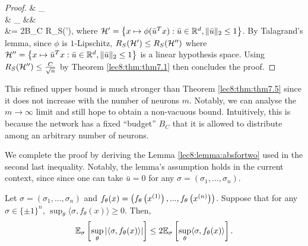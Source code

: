\begin{proof}
{&\le {} \E_{\sigma} \\
&\le {}  \E_{\sigma} &&  \\
&= 2B_C R_S(\cH '),
}
where $\mathcal H' = \left\{x \mapsto \phi(\bar{u}^T x) :  \bar{u} \in \mathbb{R}^d, \|\bar{u}\|_2 \leq 1 \right\}$. By Talagrand's lemma, since $\phi$ is $1$-Lipschitz, $R_S(\mathcal H') \leq R_S(\mathcal H'')$ where  $\mathcal H'' = \left\{x \mapsto \bar{u}^T x :  \bar{u} \in \mathbb{R}^d, \|\bar{u}\|_2 \leq 1 \right\}$ is a linear hypothesis space. Using $R_S(\mathcal H'') \leq \frac{C}{\sqrt{n}}$ by Theorem \ref{lec8:thm:thm7.1} then concludes the proof.

\end{proof}

\begin{remark}
This refined upper bound is much stronger than Theorem \ref{lec8:thm:thm7.5} since it does not increase with the number of neurons $m$. Notably, we can analyse the $m \to \infty$ limit and still hope to obtain a non-vacuous bound. Intuitively, this is because the network has a fixed ``budget'' $B_C$ that it is allowed to distribute among an arbitrary number of neurons.
\end{remark}


We complete the proof by deriving the Lemma \ref{lec8:lemma:absfortwo} used in the second last inequality. Notably, the lemma's assumption holds in the current context, since
since one can take $\bar{u} = 0$ for any $\sigma = (\sigma_1, \dots, \sigma_n)$.

\begin{lemma}\label{lec8:lemma:absfortwo}
Let $\sigma = (\sigma_1, ..., \sigma_n)$ and $f_{\theta}(x) = \left(f_{\theta}\left(x^{(1)}\right), ...,  f_{\theta}\left(x^{(n)} \right)\right)$. Suppose that for any $\sigma \in \{\pm 1\}^n$, $\sup_{\theta} \langle \sigma, f_{\theta}(x) \rangle \geq 0$. Then, 
\begin{equation}
\mathbb{E}_{\sigma}\left[ \sup_{\theta}  \left | \langle \sigma, f_{\theta}(x) \rangle \right|  \right] \leq 2 \mathbb{E}_{\sigma}\left[ \sup_{\theta}  \langle \sigma, f_{\theta}(x) \rangle   \right].
\end{equation}
\end{lemma}

